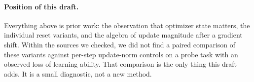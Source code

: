 \paragraph{Position of this draft.}
Everything above is prior work: the observation that optimizer state matters, the individual reset
variants, and the algebra of update magnitude after a gradient shift. Within the sources we checked, we
did not find a paired comparison of these variants against per-step update-norm controls on a probe task
with an observed loss of learning ability. That comparison is the only thing this draft adds. It is a
small diagnostic, not a new method.
